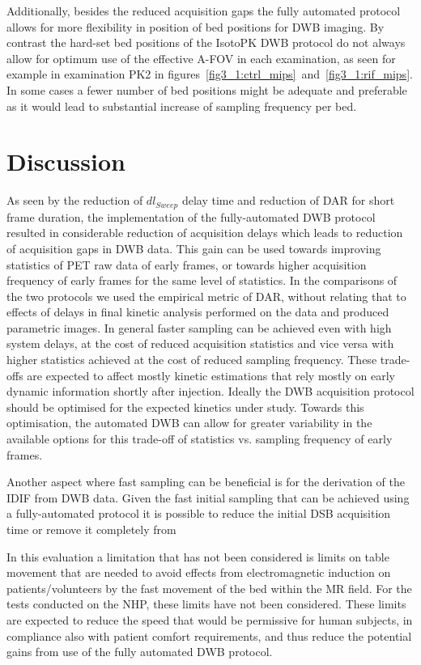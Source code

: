 Additionally, besides the reduced acquisition gaps the fully automated protocol allows for more flexibility in position of bed positions for DWB imaging. By contrast the hard-set bed positions of the IsotoPK DWB protocol do not always allow for optimum use of the effective A-FOV in each examination, as seen for example in examination PK2 in figures~\ref{fig3_1:ctrl_mips}~and~\ref{fig3_1:rif_mips}. In some cases a fewer number of bed positions might be adequate and preferable as it would lead to substantial increase of sampling frequency per bed.

\section{Discussion}

As seen by the reduction of $dl_{Sweep}$ delay time and reduction of DAR for short frame duration, the implementation of the fully-automated DWB protocol resulted in considerable reduction of acquisition delays which leads to reduction of acquisition gaps in DWB data. This gain can be used towards improving statistics of PET raw data of early frames, or towards higher acquisition frequency of early frames for the same level of statistics. 
In the comparisons of the two protocols we used the empirical metric of DAR, without relating that to effects of delays in final kinetic analysis performed on the data and produced parametric images. In general faster sampling can be achieved even with high system delays, at the cost of reduced acquisition statistics and vice versa with higher statistics achieved at the cost of reduced sampling frequency. 
These trade-offs are expected to affect mostly kinetic estimations that rely mostly on early dynamic information shortly after injection. 
Ideally the DWB acquisition protocol should be optimised for the expected kinetics under study. Towards this optimisation, the automated DWB can allow for greater variability in the available options for this trade-off of statistics vs. sampling frequency of early frames. 

Another aspect where fast sampling can be beneficial is for the derivation of the IDIF from DWB data. Given the fast initial sampling that can be achieved using a fully-automated protocol it is possible to reduce the initial DSB acquisition time or remove it completely from 

In this evaluation a limitation that has not been considered is limits on table movement that are needed to avoid effects from electromagnetic induction on patients/volunteers by the fast movement of the bed within the MR field. For the tests conducted on the NHP, these limits have not been considered. These limits are expected to reduce the speed that would be permissive for human subjects, in compliance also with patient comfort requirements, and thus reduce the potential gains from use of the fully automated DWB protocol. 

